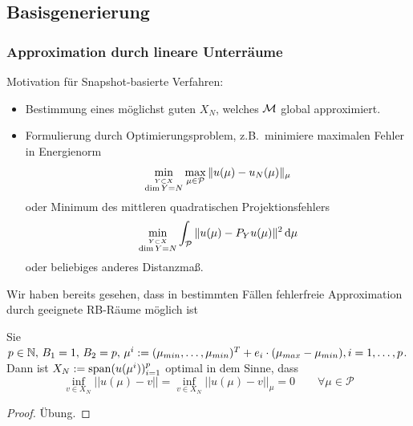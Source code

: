 \subsection{Basisgenerierung}
\label{sec-3.4}

\subsubsection*{Approximation durch lineare Unterräume}

Motivation für Snapshot-basierte Verfahren:
\begin{itemize}
	\item Bestimmung eines möglichst guten $X_N$, welches $\mathcal{M}$ global approximiert.
	\item Formulierung durch Optimierungsproblem, z.B.\ minimiere maximalen Fehler in Energienorm
		\begin{equation}
			\min_{\stackrel{Y \subset X}{\dim Y = N}} \max_{\mu \in \mathcal{P}} \|u(\mu)-u_N(\mu)\|_\mu \label{eq:3.7}
		\end{equation} 
		oder Minimum des mittleren quadratischen Projektionsfehlers
		\begin{equation}
			\min_{\stackrel{Y \subset X}{\dim Y = N}} \int_{\mathcal{P}} \|u(\mu)-P_Y u(\mu)\|^2 \,\mathrm{d}\mu  \label{eq:3.8}
		\end{equation} 
		oder beliebiges anderes Distanzmaß.
\end{itemize}

Wir haben bereits gesehen, dass in bestimmten Fällen fehlerfreie Approximation durch geeignete RB-Räume möglich ist

\begin{satz}[Optimales $X_N$ für Thermischer Block, $B_1 = 1$]
Sie $p \in \mathbb{N}, \, B_1=1, \, B_2 = p, \, \mu^i := (\mu_{min},\dots,\mu_{min})^T + e_i \cdot (\mu_{max} - \mu_{min}), i=1,\dots,p$. Dann ist $X_N := \operatorname{span}(u(\mu^i))_{i=1}^p$ optimal in dem Sinne, dass
\[
	\inf_{v \in X_N} ||u(\mu) - v|| = \inf_{v \in X_N} ||u(\mu) - v||_{\mu} = 0 \qquad \forall \mu \in \mathcal{P}
\] 
\end{satz}

\begin{proof}
Übung.
\end{proof}

